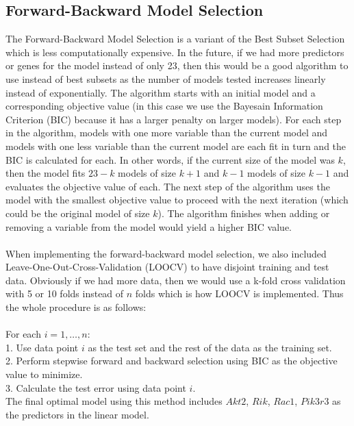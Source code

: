 \documentclass{article}
\begin{document}
\subsection{Forward-Backward Model Selection}
The Forward-Backward Model Selection is a variant of the Best Subset Selection which is less computationally expensive.  In the future, if we had more predictors or genes for the model instead of only 23, then this would be a good algorithm to use instead of best subsets as the number of models tested increases linearly instead of exponentially.  The algorithm starts with an initial model and a corresponding objective value (in this case we use the Bayesain Information Criterion (BIC) because it has a larger penalty on larger models).  For each step in the algorithm, models with one more variable than the current model and models with one less variable than the current model are each fit in turn and the BIC is calculated for each.  In other words, if the current size of the model was $k$, then the model fits $23-k$ models of size $k+1$ and $k-1$ models of size $k-1$ and evaluates the objective value of each.  The next step of the algorithm uses the model with the smallest objective value to proceed with the next iteration (which could be the original model of size $k$).  The algorithm finishes when adding or removing a variable from the model would yield a higher BIC value.\\
\null\\
When implementing the forward-backward model selection, we also included Leave-One-Out-Cross-Validation (LOOCV) to have disjoint training and test data.  Obviously if we had more data, then we would use a k-fold cross validation with 5 or 10 folds instead of $n$ folds which is how LOOCV is implemented.  Thus the whole procedure is as follows:\\
\null\\
For each $i=1,\dots, n$:\\
1. Use data point $i$ as the test set and the rest of the data as the training set.\\
2. Perform stepwise forward and backward selection using BIC as the objective value to minimize.\\
3. Calculate the test error using data point $i$. \\
The final optimal model using this method includes $Akt2$, $Rik$, $Rac1$, $Pik3r3$ as the predictors in the linear model.
\end{document}
